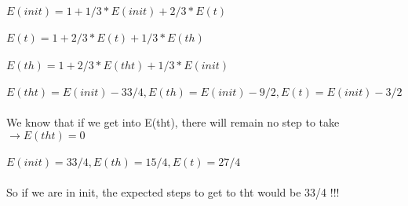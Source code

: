 \begin{latin}
\\
$E(init) = 1 + 1/3 * E(init) + 2/3 * E(t)$\\\\
$E(t) = 1 + 2/3 * E(t) + 1/3 * E(th)$\\\\
$E(th) = 1 + 2/3 * E(tht) + 1/3 * E(init)$\\\\
$E(tht) = E(init) - 33/4, E(th) = E(init) - 9/2, E(t) = E(init) - 3/2$\\\\
We know that if we get into E(tht), there will remain no step to take $\rightarrow E(tht) = 0$ \\ \\
$E(init) = 33/4, E(th) = 15/4,E(t)=27/4$\\\\
So if we are in init, the expected steps to get to tht would be 33/4 !!!
\end{latin}